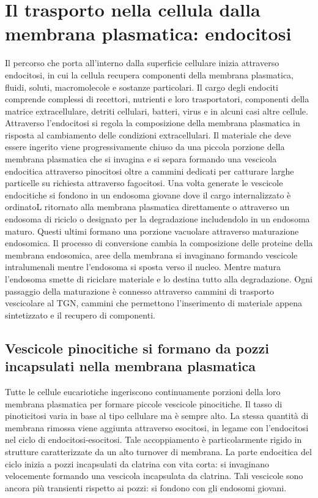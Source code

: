 \section{Il trasporto nella cellula dalla membrana plasmatica: endocitosi}
Il percorso che porta all'interno dalla superficie cellulare inizia attraverso endocitosi, in cui la cellula recupera componenti della membrana plasmatica, fluidi, soluti, macromolecole
e sostanze particolari. Il cargo degli endociti comprende complessi di recettori, nutrienti e loro trasportatori, componenti della matrice extracellulare, detriti cellulari, batteri, 
virus e in alcuni casi altre cellule. Attraverso l'endocitosi si regola la composizione della membrana plasmatica in risposta al cambiamento delle condizioni extracellulari. Il 
materiale che deve essere ingerito viene progressivamente chiuso da una piccola porzione della membrana plasmatica che si invagina e si separa formando una vescicola endocitica 
attraverso pinocitosi oltre a cammini dedicati per catturare larghe particelle su richiesta attraverso fagocitosi. Una volta generate le vescicole endocitiche si fondono in un
endosoma giovane dove il cargo internalizzato \`e ordinatoL ritornato alla membrana plasmatica direttamente o attraverso un endosoma di riciclo o designato per la degradazione 
includendolo in un endosoma maturo. Questi ultimi formano una porzione vacuolare attraverso maturazione endosomica. Il processo di conversione cambia la composizione delle proteine
della membrana endosomica, aree della membrana si invaginano formando vescicole intralumenali mentre l'endosoma si sposta verso il nucleo. Mentre matura l'endosoma smette di riciclare
materiale e lo destina tutto alla degradazione. Ogni passaggio della maturazione \`e connesso attraverso cammini di trasporto vescicolare al TGN, cammini che permettono l'inserimento
di materiale appena sintetizzato e il recupero di componenti.
\subsection{Vescicole pinocitiche si formano da pozzi incapsulati nella membrana plasmatica}
Tutte le cellule eucariotiche ingeriscono continuamente porzioni della loro membrana plasmatica per formare piccole vescicole pinocitiche. Il tasso di pinoticitosi varia in base al tipo
cellulare ma \`e sempre alto. La stessa quantit\`a di membrana rimossa viene aggiunta attraverso esocitosi, in legame con l'endocitosi nel ciclo di endocitosi-esocitosi. Tale 
accoppiamento \`e particolarmente rigido in strutture caratterizzate da un alto turnover di membrana. La parte endocitica del ciclo inizia a pozzi incapsulati da clatrina con vita corta:
si invaginano velocemente formando una vescicola incapsulata da clatrina. Tali vescicole sono ancora pi\`u transienti rispetto ai pozzi: si fondono con gli endosomi giovani.
